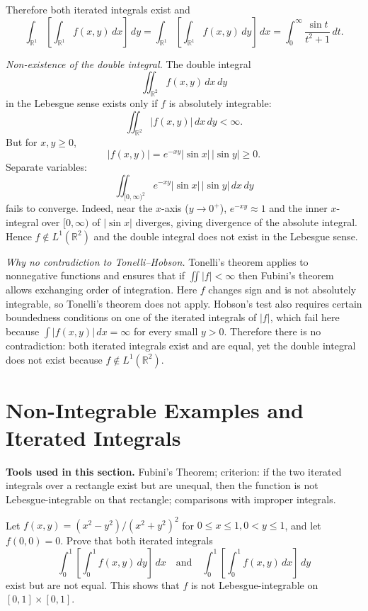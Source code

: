 Therefore both iterated integrals exist and
\[
\int_{\mathbb{R}^1} \left[ \int_{\mathbb{R}^1} f(x, y) \, dx \right] \, dy
=
\int_{\mathbb{R}^1} \left[ \int_{\mathbb{R}^1} f(x, y) \, dy \right] \, dx
= \int_0^\infty \frac{\sin t}{t^2+1} \, dt.
\]

\emph{Non-existence of the double integral.}
The double integral
\[
\iint_{\mathbb{R}^2} f(x,y) \, dx \, dy
\]
in the Lebesgue sense exists only if \(f\) is absolutely integrable:
\[
\iint_{\mathbb{R}^2} |f(x,y)| \, dx \, dy < \infty.
\]
But for \(x,y \ge 0\),
\[
|f(x,y)| = e^{-xy} |\sin x| \, |\sin y| \ge 0.
\]
Separate variables:
\[
\iint_{[0,\infty)^2} e^{-xy} |\sin x|\, |\sin y| \, dx\, dy
\]
fails to converge. Indeed, near the \(x\)-axis (\(y \to 0^+\)), \(e^{-xy} \approx 1\) and the inner \(x\)-integral over \([0,\infty)\) of \(|\sin x|\) diverges, giving divergence of the absolute integral.  
Hence \(f \notin L^1(\mathbb{R}^2)\) and the double integral does not exist in the Lebesgue sense.

\emph{Why no contradiction to Tonelli--Hobson.}
Tonelli's theorem applies to nonnegative functions and ensures that if \(\iint |f| < \infty\) then Fubini's theorem allows exchanging order of integration.  
Here \(f\) changes sign and is not absolutely integrable, so Tonelli's theorem does not apply.  
Hobson's test also requires certain boundedness conditions on one of the iterated integrals of \(|f|\), which fail here because \(\int |f(x,y)|\, dx = \infty\) for every small \(y > 0\).  
Therefore there is no contradiction: both iterated integrals exist and are equal, yet the double integral does not exist because \(f \notin L^1(\mathbb{R}^2)\).

\section{Non-Integrable Examples and Iterated Integrals}

\noindent\textbf{Tools used in this section.} Fubini's Theorem; criterion: if the two iterated integrals over a rectangle exist but are unequal, then the function is not Lebesgue-integrable on that rectangle; comparisons with improper integrals.

\begin{problembox}
Let \( f(x, y) = (x^2 - y^2)/(x^2 + y^2)^2 \) for \( 0 \leq x \leq 1, 0 < y \leq 1 \), and let \( f(0, 0) = 0 \). Prove that both iterated integrals
\[
\int_0^1 \left[ \int_0^1 f(x, y) \, dy \right] \, dx \quad \text{and} \quad \int_0^1 \left[ \int_0^1 f(x, y) \, dx \right] \, dy
\]
exist but are not equal. This shows that \( f \) is not Lebesgue-integrable on \([0, 1] \times [0, 1]\).
\end{problembox}

